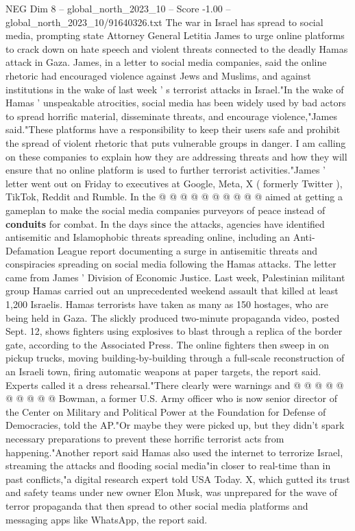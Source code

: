 \begin{textsample}{NEG Dim 8 – global\_north\_2023\_10 – Score -1.00 – global\_north\_2023\_10/91640326.txt}  \label{ex:f8_neg_240}
The war in Israel has spread to social media, prompting state Attorney General Letitia James to urge online platforms to crack down on hate speech and violent threats connected to the deadly Hamas attack in Gaza.
James, in a letter to social media companies, said the online rhetoric had encouraged violence against Jews and Muslims, and against institutions in the wake of last week ' s terrorist attacks in Israel."In the wake of Hamas ' unspeakable atrocities, social media has been widely used by bad actors to spread horrific material, disseminate threats, and encourage violence,"James said."These platforms have a responsibility to keep their users safe and prohibit the spread of violent rhetoric that puts vulnerable groups in danger.
I am calling on these companies to explain how they are addressing threats and how they will ensure that no online platform is used to further terrorist activities."James ' letter went out on Friday to executives at Google, Meta, X ( formerly Twitter ), TikTok, Reddit and Rumble.
In the @ @ @ @ @ @ @ @ @ @ aimed at getting a gameplan to make the social media companies purveyors of peace instead of \textbf{conduits} for combat.
In the days since the attacks, agencies have identified antisemitic and Islamophobic threats spreading online, including an Anti-Defamation League report documenting a surge in antisemitic threats and conspiracies spreading on social media following the Hamas attacks.
The letter came from James ' Division of Economic Justice.
Last week, Palestinian militant group Hamas carried out an unprecedented weekend assault that killed at least 1,200 Israelis.
Hamas terrorists have taken as many as 150 hostages, who are being held in Gaza.
The slickly produced two-minute propaganda video, posted Sept. 12, shows fighters using explosives to blast through a replica of the border gate, according to the Associated Press.
The online fighters then sweep in on pickup trucks, moving building-by-building through a full-scale reconstruction of an Israeli town, firing automatic weapons at paper targets, the report said.
Experts called it a dress rehearsal."There clearly were warnings and @ @ @ @ @ @ @ @ @ @ Bowman, a former U.S.
Army officer who is now senior director of the Center on Military and Political Power at the Foundation for Defense of Democracies, told the AP."Or maybe they were picked up, but they didn't spark necessary preparations to prevent these horrific terrorist acts from happening."Another report said Hamas also used the internet to terrorize Israel, streaming the attacks and flooding social media"in closer to real-time than in past conflicts,"a digital research expert told USA Today.
X, which gutted its trust and safety teams under new owner Elon Musk, was unprepared for the wave of terror propaganda that then spread to other social media platforms and messaging apps like WhatsApp, the report said.

\end{textsample}
